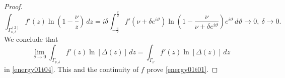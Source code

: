 \begin{proof}
\begin{equation*}
  \int_{\Gamma_{\nu,\delta}^{(2)}} f'(z) \ln(1- \frac{\nu}{z})\, dz
     = i \delta\int_{-\frac{\pi}{2}}^{\frac{\pi}{2}} f'(\nu+\delta e^{i\vartheta}) 
                         \ln(1- \frac{\nu}{\nu+\delta e^{i\vartheta}})e^{i\vartheta}\, d\vartheta \to 0,\ \delta\to 0 .
\end{equation*}
We conclude that
\begin{equation*}
  \lim_{\delta\to 0} \int_{\Gamma_{\nu,\delta}} f'(z) \ln[\Delta(z)]\, dz
     = \int_{\Gamma_\nu} f'(z) \ln[\Delta(z)]\, dz
\end{equation*}
in \eqref{energy01t04}. This and the continuity of $f$ prove \eqref{energy01t01}.
\end{proof}
